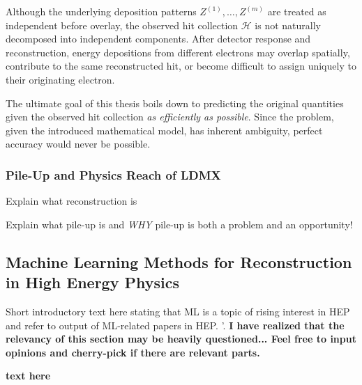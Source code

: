 Although the underlying deposition patterns \(Z^{(1)},\ldots,Z^{(m)}\) are treated as independent before overlay, the observed hit collection \(\mathcal{H}\) is not naturally decomposed into independent components. After detector response and reconstruction, energy depositions from different electrons may overlap spatially, contribute to the same reconstructed hit, or become difficult to assign uniquely to their originating electron. 

The ultimate goal of this thesis boils down to predicting the original quantities given the observed hit collection \textit{as efficiently as possible}. Since the problem, given the introduced mathematical model, has inherent ambiguity, perfect accuracy would never be possible.



\subsubsection{Pile-Up and Physics Reach of LDMX}

Explain what reconstruction is

Explain what pile-up is and \textit{WHY} pile-up is both a problem and an opportunity!



\subsection{Machine Learning Methods for Reconstruction in High Energy Physics}
\label{sec:ml_event_reconstruction_hep}


Short introductory text here stating that ML is a topic of rising interest in HEP and refer to output of ML-related papers in HEP. \cite{iml-wg-hepml-livingreview}'. \textbf{I have realized that the relevancy of this section may be heavily questioned... Feel free to input opinions and cherry-pick if there are relevant parts.}


\textbf{text here}

